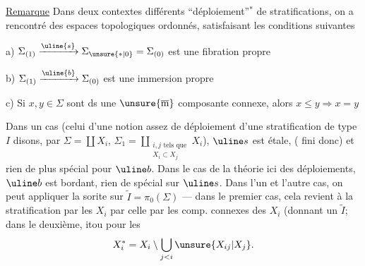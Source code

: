 \uline{Remarque} Dans deux contextes différents
``déploiement''$^{*}$ de  stratifications, on
a rencontré des espaces topologiques ordonnés\inserted{$\Sigma$},
satisfaisant les conditions suivantes


a) $\Sigma_{(1)}\xrightarrow{\uline{s}}\Sigma_{\unsure{*|0}}=\Sigma_{(0)}$
est une fibration propre

b) $\Sigma_{(1)}\xrightarrow{\uline{b}}\Sigma_{(0)}$ est une immersion propre

c) Si $x,y\in\Sigma$ sont ds une $\unsure{\overline{\mathrm m}}$ composante connexe,
alors $x\leq y\Longrightarrow x=y$


Dans un cas (celui d'une notion assez 
 de déploiement d'une stratification de type $I$ disons,
par $\Sigma=\coprod X_i$,
$\Sigma_1=\displaystyle\coprod_{\substack{i,j\text{ tels que}\\X_i\subset X_j}}X_i$),
$\uline s$ est étale, ( fini donc) et rien de plus spécial pour $\uline b$.
Dans le cas de la théorie 
ici des déploiements,
$\uline b$ est bordant, rien de spécial sur $\uline s$.
Dans l'un et l'autre cas, on peut appliquer la sorite
sur $\widetilde I=\pi_0(\Sigma)$ --- dans le premier cas,
cela revient à  la stratification par les $X_i$ par celle
par les comp. connexes des $X_i$ (donnant un $\widetilde I$;
dans le deuxième,
itou pour les
\[
X_i^{*}=X_i\setminus\bigcup_{j<i}\unsure{X_{ij}|X_j}.
\]
